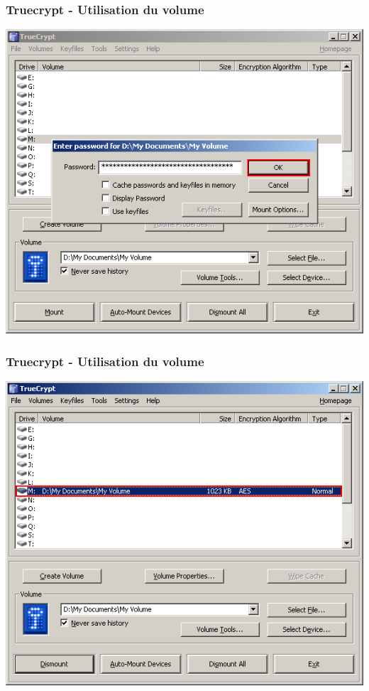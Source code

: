 \documentclass{beamer}
\begin{document}
\begin{frame}
\frametitle{Truecrypt - Utilisation du volume}
\begin{center}
\includegraphics[scale=0.5] {./images/Truecrypt18.png} 
\end{center}
\end{frame}
\begin{frame}
\frametitle{Truecrypt - Utilisation du volume}
\begin{center}
\includegraphics[scale=0.5] {./images/Truecrypt19.png} 
\end{center}
\end{frame}
\end{document}
